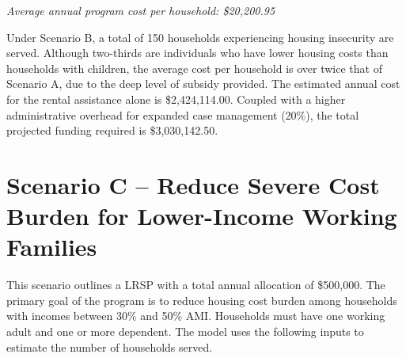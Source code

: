 \documentclass[
  10pt,
  letterpaper,
  DIV=11,
  numbers=noendperiod]{scrartcl}
\begin{document}
\begin{tcolorbox}[enhanced jigsaw, breakable, toprule=.15mm, opacitybacktitle=0.6, colframe=quarto-callout-note-color-frame, colback=white, opacityback=0, coltitle=black, colbacktitle=quarto-callout-note-color!10!white, rightrule=.15mm, toptitle=1mm, titlerule=0mm, title=\textcolor{quarto-callout-note-color}{\faInfo}\hspace{0.5em}{Scenario B results}, bottomtitle=1mm, bottomrule=.15mm, leftrule=.75mm, arc=.35mm, left=2mm]

\emph{Average annual program cost per household: \$20,200.95}

\hfill\break
Under Scenario B, a total of 150 households experiencing housing
insecurity are served. Although two-thirds are individuals who have
lower housing costs than households with children, the average cost per
household is over twice that of Scenario A, due to the deep level of
subsidy provided. The estimated annual cost for the rental assistance
alone is \$2,424,114.00. Coupled with a higher administrative overhead
for expanded case management (20\%), the total projected funding
required is \$3,030,142.50.

\end{tcolorbox}

\newpage

\section{Scenario C -- Reduce Severe Cost Burden for Lower-Income
Working
Families}\label{scenario-c-reduce-severe-cost-burden-for-lower-income-working-families}

This scenario outlines a LRSP with a total annual allocation of
\$500,000. The primary goal of the program is to reduce housing cost
burden among households with incomes between 30\% and 50\% AMI.
Households must have one working adult and one or more dependent. The
model uses the following inputs to estimate the number of households
served.
\end{document}
